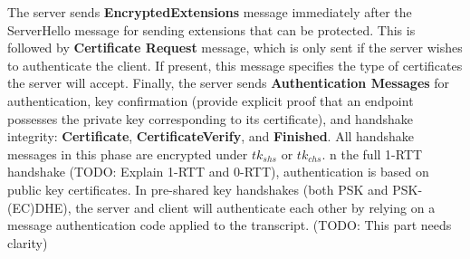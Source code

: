 The server sends \textbf{EncryptedExtensions} message immediately after the ServerHello message for sending extensions that can be protected. This is followed by \textbf{Certificate Request} message, which is only sent if the server wishes to authenticate the client. If present, this message specifies the type of certificates the server will accept. Finally, the server sends \textbf{Authentication Messages} for authentication, key confirmation (provide explicit proof that an endpoint possesses the private key corresponding to its certificate), and handshake
integrity: \textbf{Certificate}, \textbf{CertificateVerify}, and \textbf{Finished}. All handshake messages in this phase are encrypted under $tk_{shs}$ or $tk_{chs}$. n the full 1-RTT handshake (TODO: Explain 1-RTT and 0-RTT), authentication is based on public key certificates. In pre-shared key handshakes (both PSK and PSK-(EC)DHE), the
server and client will authenticate each other by relying on a message authentication code applied to the transcript. (TODO: This part needs clarity)

